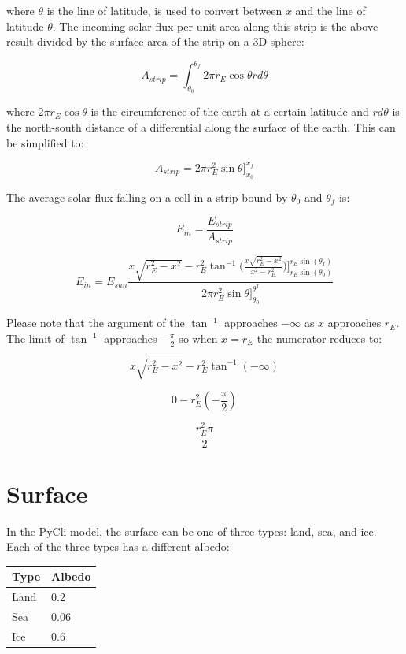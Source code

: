 \documentclass[12pt]{article} %
\begin{document}
where $\theta$ is the line of latitude, is used to convert between $x$ and the line of latitude $\theta$. The incoming solar flux per
unit area along this strip is the above result divided by the surface area of the strip on a 3D sphere:

$$A_{strip} = \int_{\theta_{0}}^{\theta_{f}} 2 \pi r_{E} \cos{\theta} r d\theta $$

where $2 \pi r_{E} \cos{\theta}$ is the circumference of the earth at a certain latitude and $r d\theta$ is the north-south distance of a differential along the surface of the earth. This can be simplified to:

$$A_{strip} =  2 \pi r_{E}^2 \sin{\theta}\bigg]_{x_0}^{x_f} $$

The average solar flux falling on a cell in a strip bound by $\theta_0$ and $\theta_f$ is:

$$E_{in} = \frac{E_{strip}}{A_{strip}}$$

$$\boxed{E_{in} = E_{sun}\frac{x \sqrt{r_{E}^2 - x^2} -  r_{E}^2 \tan^{-1}\bigg({\frac{x \sqrt{r_{E}^2 - x^2}}{x^2 - r_{E}^2 }}\bigg)\bigg]_{r_{E}\sin(\theta_0)}^{r_{E}\sin(\theta_f)}}{2 \pi r_{E}^2 \sin{\theta}]_{\theta_0}^{\theta^f}}}$$

Please note that the argument of the $\tan^{-1}$ approaches $-\infty$ as $x$ approaches $r_{E}$. The limit of $\tan^{-1}$ approaches $-\frac{\pi}{2}$ so when $x = r_{E}$ the numerator reduces to:

$$x \sqrt{r_{E}^2 - x^2} -  r_{E}^2 \tan^{-1}(-\infty)$$

$$0 -  r_{E}^2 (-\frac{\pi}{2})$$

$$\frac{r_{E}^2 \pi}{2}$$

\newpage
\section{Surface}
\label{sec:surface}

In the PyCli model, the surface can be one of three types: land, sea, and ice. Each of the three types has a different albedo:

\begin{center}
\begin{tabular}{|m{4 cm}| m{2 cm}|} \hline
\textbf{Type} & \textbf{Albedo} \\ \hline
Land & 0.2\\ \hline
Sea & 0.06\\ \hline
Ice & 0.6\\ \hline
\end{tabular}
\end{center}
\end{document}
